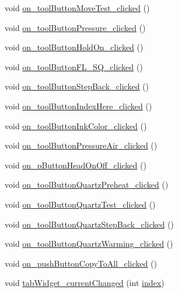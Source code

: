 \begin{DoxyCompactItemize}
\item 
void \mbox{\hyperlink{classSettingDialog_a9fd57e56c1364cb5107b314bec9d414d}{on\+\_\+tool\+Button\+Move\+Test\+\_\+clicked}} ()
\item 
void \mbox{\hyperlink{classSettingDialog_a0745d27f5e4a4d24b0722123bc06d25e}{on\+\_\+tool\+Button\+Pressure\+\_\+clicked}} ()
\item 
void \mbox{\hyperlink{classSettingDialog_ac1ac55a6bfd2730cad20f4bcc2805049}{on\+\_\+tool\+Button\+Hold\+On\+\_\+clicked}} ()
\item 
void \mbox{\hyperlink{classSettingDialog_a40f0ebcd38f004373ce6037a47f55da7}{on\+\_\+tool\+Button\+F\+L\+\_\+\+S\+Q\+\_\+clicked}} ()
\item 
void \mbox{\hyperlink{classSettingDialog_a24027ff6daaf9b3537de48ec915ad428}{on\+\_\+tool\+Button\+Step\+Back\+\_\+clicked}} ()
\item 
void \mbox{\hyperlink{classSettingDialog_ae6edcd6a2151ec8402904fd33cbd1a95}{on\+\_\+tool\+Button\+Index\+Here\+\_\+clicked}} ()
\item 
void \mbox{\hyperlink{classSettingDialog_aa4c4eae09fcec8ad3a2bb8615e314e39}{on\+\_\+tool\+Button\+Ink\+Color\+\_\+clicked}} ()
\item 
void \mbox{\hyperlink{classSettingDialog_a08f91f306b9e5fbe3f24dea1bc8b7152}{on\+\_\+tool\+Button\+Pressure\+Air\+\_\+clicked}} ()
\item 
void \mbox{\hyperlink{classSettingDialog_a0fd7b8d8b9d06ff10dd9136e699cb5f0}{on\+\_\+p\+Button\+Head\+On\+Off\+\_\+clicked}} ()
\item 
void \mbox{\hyperlink{classSettingDialog_a2eb481548395d6d2459456076678bcf1}{on\+\_\+tool\+Button\+Quartz\+Preheat\+\_\+clicked}} ()
\item 
void \mbox{\hyperlink{classSettingDialog_a4030986a71c3245c64458117b358f5cc}{on\+\_\+tool\+Button\+Quartz\+Test\+\_\+clicked}} ()
\item 
void \mbox{\hyperlink{classSettingDialog_a7c13d35ab90a6bc7e77a7eb02e90df82}{on\+\_\+tool\+Button\+Quartz\+Step\+Back\+\_\+clicked}} ()
\item 
void \mbox{\hyperlink{classSettingDialog_af6128bbe3289b7033e27d0e2d439e24b}{on\+\_\+tool\+Button\+Quartz\+Warming\+\_\+clicked}} ()
\item 
void \mbox{\hyperlink{classSettingDialog_a991a3f7add65873f5e790dbc5b2d98f7}{on\+\_\+push\+Button\+Copy\+To\+All\+\_\+clicked}} ()
\item 
void \mbox{\hyperlink{classSettingDialog_a1e0138fa136b0723568b8ebed97fc6f6}{tab\+Widget\+\_\+current\+Changed}} (int \mbox{\hyperlink{classSettingDialog_a293670a08207442bb9ab04a734b70d33}{index}})

\end{DoxyCompactItemize}
